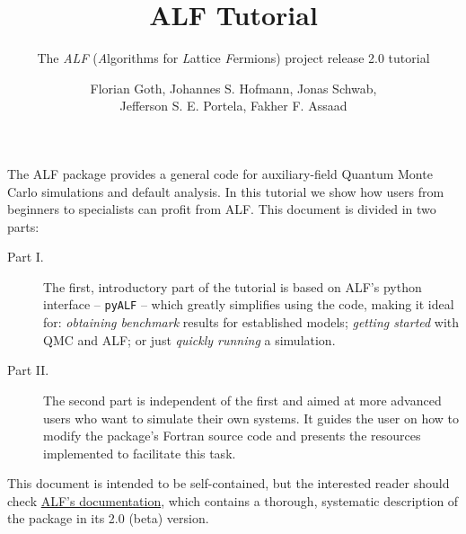 \documentclass[10pt,modern]{scrartcl}
\numberwithin{exerciseitem}{exercise} %
\begin{document}
\title{ ALF Tutorial }
\subtitle{The \emph{ALF} (\emph{A}lgorithms for \emph{L}attice \emph{F}ermions) project release 2.0 tutorial} %
\author{Florian Goth,  Johannes S. Hofmann,  Jonas Schwab,\\  Jefferson S. E. Portela,  Fakher F. Assaad }
\maketitle



The ALF package provides a general code for auxiliary-field Quantum Monte Carlo simulations and default analysis. In this tutorial we show how users from beginners to specialists can profit from ALF. This document is divided in two parts:
\begin{description}
\item[Part I.] The first, introductory part of the tutorial is based on ALF's python interface -- \texttt{pyALF} -- which greatly simplifies using the code, making it ideal for: \emph{obtaining benchmark} results for established models; \emph{getting started} with QMC and ALF; or just \emph{quickly running} a simulation.
\item[Part II.] The second part is independent of the first and aimed at more advanced users who want to simulate their own systems. It guides the user on how to modify the package's Fortran source code and presents the resources implemented to facilitate this task.
\end{description}

This document is intended to be self-contained, but the interested reader should check \href{https://git.physik.uni-wuerzburg.de/ALF/ALF/-/blob/master/Documentation/doc.pdf}{ALF's documentation}, which contains a thorough, systematic description of the package in its 2.0 (beta) version.


\end{document}
